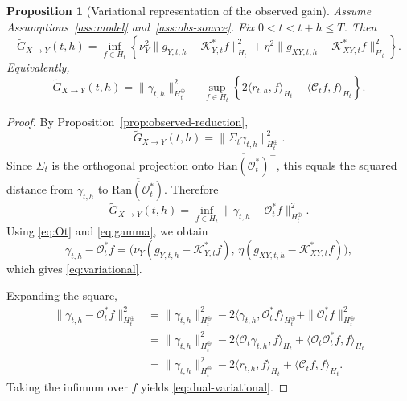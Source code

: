 \documentclass[11pt,a4paper]{amsart}
\theoremstyle{plain}
\newtheorem{proposition}[theorem]{Proposition}
\theoremstyle{definition}
\theoremstyle{remark}
\begin{document}
\begin{proposition}[Variational representation of the observed gain]
\label{prop:variational}
Assume Assumptions~\ref{ass:model} and~\ref{ass:obs-source}. Fix $0<t<t+h\le T$. Then
\begin{equation}\label{eq:variational}
\widetilde G_{X\to Y}(t,h)
=
\inf_{f\in H_t}
\left\{
\nu_Y^2\|g_{Y,t,h}-\mathcal K_{Y,t}^*f\|_{H_t}^2
+
\eta^2\|g_{XY,t,h}-\mathcal K_{XY,t}^*f\|_{H_t}^2
\right\}.
\end{equation}
Equivalently,
\begin{equation}\label{eq:dual-variational}
\widetilde G_{X\to Y}(t,h)
=
\|\gamma_{t,h}\|_{H_t^\oplus}^2
- \sup_{f\in H_t}
\left\{
2\langle r_{t,h},f\rangle_{H_t}
- \langle \mathcal C_t f,f\rangle_{H_t}
\right\}.
\end{equation}
\end{proposition}

\begin{proof}
By Proposition~\ref{prop:observed-reduction},
\[
\widetilde G_{X\to Y}(t,h)=\|\Sigma_t\gamma_{t,h}\|_{H_t^\oplus}^2.
\]
Since $\Sigma_t$ is the orthogonal projection onto
$\overline{\mathrm{Ran}(\mathcal O_t^*)}^\perp$, this equals the squared distance from
$\gamma_{t,h}$ to $\overline{\mathrm{Ran}(\mathcal O_t^*)}$. Therefore
\[
\widetilde G_{X\to Y}(t,h)
=
\inf_{f\in H_t}\|\gamma_{t,h}-\mathcal O_t^*f\|_{H_t^\oplus}^2.
\]
Using \eqref{eq:Ot} and \eqref{eq:gamma}, we obtain
\[
\gamma_{t,h}-\mathcal O_t^*f
=
\bigl(\nu_Y(g_{Y,t,h}-\mathcal K_{Y,t}^*f),\,
\eta(g_{XY,t,h}-\mathcal K_{XY,t}^*f)\bigr),
\]
which gives \eqref{eq:variational}.

Expanding the square,
\begin{align*}
\|\gamma_{t,h}-\mathcal O_t^*f\|_{H_t^\oplus}^2
&=
\|\gamma_{t,h}\|_{H_t^\oplus}^2
-2\langle \gamma_{t,h},\mathcal O_t^*f\rangle_{H_t^\oplus}
+\|\mathcal O_t^*f\|_{H_t^\oplus}^2 \\
&=
\|\gamma_{t,h}\|_{H_t^\oplus}^2
-2\langle \mathcal O_t\gamma_{t,h},f\rangle_{H_t}
+\langle \mathcal O_t\mathcal O_t^*f,f\rangle_{H_t} \\
&=
\|\gamma_{t,h}\|_{H_t^\oplus}^2
-2\langle r_{t,h},f\rangle_{H_t}
+\langle \mathcal C_t f,f\rangle_{H_t}.
\end{align*}
Taking the infimum over $f$ yields \eqref{eq:dual-variational}.
\end{proof}
\end{document}

